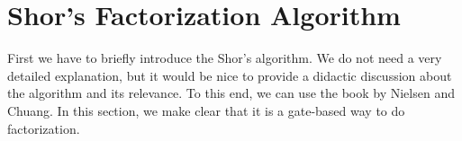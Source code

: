 \section{Shor's Factorization Algorithm}

First we have to briefly introduce the Shor's algorithm. We do not need a very detailed explanation, but it would be nice to provide a didactic discussion about the algorithm and its relevance. To this end, we can use the book by Nielsen and Chuang. In this section, we make clear that it is a gate-based way to do factorization.

\lipsum[1]